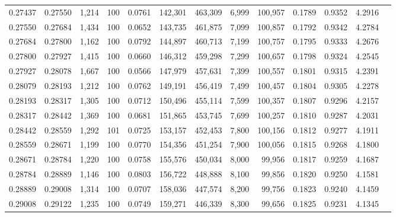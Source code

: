 \begin{tabular}{rrrrrrrrrrrrr}
0.27437 & 0.27550 & 1,214 & 100 &                                     0.0761 & 142,301 & 463,309 &   6,999 & 100,957 & 0.1789 & 0.9352 & 4.2916 \\
0.27550 & 0.27684 & 1,434 & 100 &                                     0.0652 & 143,735 & 461,875 &   7,099 & 100,857 & 0.1792 & 0.9342 & 4.2784 \\
0.27684 & 0.27800 & 1,162 & 100 &                                     0.0792 & 144,897 & 460,713 &   7,199 & 100,757 & 0.1795 & 0.9333 & 4.2676 \\
0.27800 & 0.27927 & 1,415 & 100 &                                     0.0660 & 146,312 & 459,298 &   7,299 & 100,657 & 0.1798 & 0.9324 & 4.2545 \\
0.27927 & 0.28078 & 1,667 & 100 &                                     0.0566 & 147,979 & 457,631 &   7,399 & 100,557 & 0.1801 & 0.9315 & 4.2391 \\
0.28079 & 0.28193 & 1,212 & 100 &                                     0.0762 & 149,191 & 456,419 &   7,499 & 100,457 & 0.1804 & 0.9305 & 4.2278 \\
0.28193 & 0.28317 & 1,305 & 100 &                                     0.0712 & 150,496 & 455,114 &   7,599 & 100,357 & 0.1807 & 0.9296 & 4.2157 \\
0.28317 & 0.28442 & 1,369 & 100 &                                     0.0681 & 151,865 & 453,745 &   7,699 & 100,257 & 0.1810 & 0.9287 & 4.2031 \\
0.28442 & 0.28559 & 1,292 & 101 &                                     0.0725 & 153,157 & 452,453 &   7,800 & 100,156 & 0.1812 & 0.9277 & 4.1911 \\
0.28559 & 0.28671 & 1,199 & 100 &                                     0.0770 & 154,356 & 451,254 &   7,900 & 100,056 & 0.1815 & 0.9268 & 4.1800 \\
0.28671 & 0.28784 & 1,220 & 100 &                                     0.0758 & 155,576 & 450,034 &   8,000 &  99,956 & 0.1817 & 0.9259 & 4.1687 \\
0.28784 & 0.28889 & 1,146 & 100 &                                     0.0803 & 156,722 & 448,888 &   8,100 &  99,856 & 0.1820 & 0.9250 & 4.1581 \\
0.28889 & 0.29008 & 1,314 & 100 &                                     0.0707 & 158,036 & 447,574 &   8,200 &  99,756 & 0.1823 & 0.9240 & 4.1459 \\
0.29008 & 0.29122 & 1,235 & 100 &                                     0.0749 & 159,271 & 446,339 &   8,300 &  99,656 & 0.1825 & 0.9231 & 4.1345 \\

\end{tabular}
